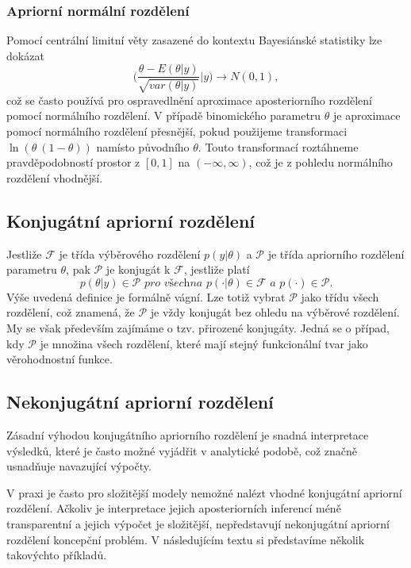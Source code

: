 \subsubsection{Apriorní normální rozdělení}

Pomocí centrální limitní věty zasazené do kontextu Bayesiánské statistiky lze dokázat
\begin{equation}
\Big(\frac{\theta - E(\theta | y)}{\sqrt{var(\theta | y)}} | y \Big) \rightarrow N(0, 1),
\end{equation}
což se často používá pro ospravedlnění aproximace aposteriorního rozdělení pomocí normálního rozdělení. V případě binomického parametru $\theta$ je aproximace pomocí normálního rozdělení přesnější, pokud použijeme transformaci $\ln(\theta \ (1 - \theta))$ namísto původního $\theta$. Touto transformací roztáhneme pravděpodobností prostor z $[0, 1]$ na $(-\infty, \infty)$, což je z pohledu normálního rozdělení vhodnější.

\subsection{Konjugátní apriorní rozdělení}

Jestliže $\mathcal{F}$ je třída výběrového rozdělení $p(y|\theta)$ a $\mathcal{P}$ je třída apriorního rozdělení parametru $\theta$, pak $\mathcal{P}$ je konjugát k $\mathcal{F}$, jestliže platí
\begin{equation}
p(\theta | y) \in \mathcal{P} \textit{ pro všechna } p(\cdot | \theta) \in \mathcal{F} \textit{ a } p(\cdot) \in \mathcal{P}.
\end{equation}
Výše uvedená definice je formálně vágní. Lze totiž vybrat $\mathcal{P}$ jako třídu všech rozdělení, což znamená, že $\mathcal{P}$ je vždy konjugát bez ohledu na výběrové rozdělení. My se však především zajímáme o tzv. přirozené konjugáty. Jedná se o případ, kdy $\mathcal{P}$ je množina všech rozdělení, které mají stejný funkcionální tvar jako věrohodnostní funkce.

\subsection{Nekonjugátní apriorní rozdělení}

Zásadní výhodou konjugátního apriorního rozdělení je snadná interpretace výsledků, které je často možné vyjádřit v analytické podobě, což značně usnadňuje navazující výpočty.

V praxi je často pro složitější modely nemožné nalézt vhodné konjugátní apriorní rozdělení. Ačkoliv je interpretace jejich aposteriorních inferencí méně transparentní a jejich výpočet je složitější, nepředstavují nekonjugátní apriorní rozdělení koncepční problém. V následujícím textu si představíme několik takovýchto příkladů.

